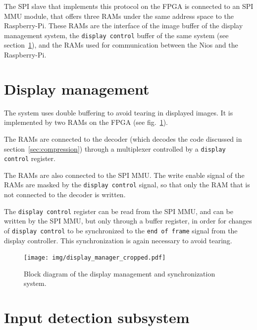 \documentclass[english, DIV=13]{scrreprt}
\begin{document}
The SPI slave that implements this protocol on the FPGA is connected to an SPI MMU module,
that offers three RAMs under the same address space to the Raspberry-Pi.
These RAMs are the interface of the image buffer of the display management system,
the \texttt{display control} buffer of the same system
(see section~\ref{sec:display-mngt}), and the RAMs used for communication between
the Nios and the Raspberry-Pi.

\section{Display management}
\label{sec:display-mngt}

The system uses double buffering to avoid tearing in displayed images.
It is implemented by two RAMs on the FPGA (see fig.~\ref{fig:display-manager}).

The RAMs are connected to the decoder
(which decodes the code discussed in section~\ref{sec:compression})
through a multiplexer controlled by a \texttt{display control} register.

The RAMs are also connected to the SPI MMU. The write enable
signal of the RAMs are masked by the \texttt{display control} signal,
so that only the RAM that is not connected to the decoder is written.

The \texttt{display control} register can be read from the SPI MMU,
and can be written by the SPI MMU, but only through a buffer register,
in order for changes of \texttt{display control} to be synchronized
to the \texttt{end of frame} signal from the display controller.
This synchronization is again necessary to avoid tearing.

\begin{figure}[bth]
    \centering
    \texttt{[image: img/display\_manager\_cropped.pdf]}
    \caption{Block diagram of the display management and synchronization system.}
    \label{fig:display-manager}
\end{figure}

\section{Input detection subsystem}
\label{sec:input-det}
\end{document}
